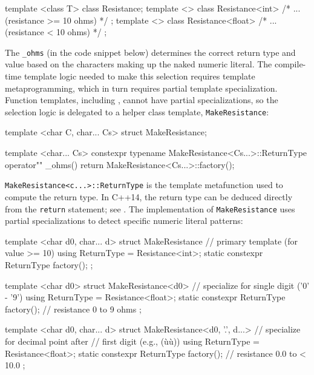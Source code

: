\begin{emcppslisting}[emcppsbatch=e12]
template <class T> class Resistance;
template <> class Resistance<int>   { /* ... (resistance >= 10 ohms) */ };
template <> class Resistance<float> { /* ... (resistance <  10 ohms) */ };
\end{emcppslisting}

\noindent The \lstinline!_ohms!  (in the code snippet below) determines the correct
return type and value based on the characters making up the naked
numeric literal. The compile-time template logic needed to make this
selection requires template metaprogramming, which in turn requires
partial template specialization. Function templates, including
, cannot have partial specializations,
so the selection logic is delegated to a helper class template,
\lstinline!MakeResistance!:

\begin{emcppslisting}[emcppsbatch=e12]
template <char C, char... Cs> struct MakeResistance;

template <char... Cs>
constexpr typename MakeResistance<Cs...>::ReturnType
operator"" _ohms() { return MakeResistance<Cs...>::factory(); }
\end{emcppslisting}

\noindent \lstinline!MakeResistance<c...>::ReturnType! is the template metafunction used to compute the return type. In C++14, the return type can
be deduced directly from the \lstinline!return! statement; see .
The implementation of \lstinline!MakeResistance! uses partial
specializations to detect specific numeric literal patterns:

\begin{emcppslisting}[emcppsbatch=e12]
template <char d0, char... d>
struct MakeResistance  // primary template (for value >= 10)
{
    using ReturnType = Resistance<int>;
    static constexpr ReturnType factory();
};

template <char d0>
struct MakeResistance<d0>  // specialize for single digit ('0' - '9')
{
    using ReturnType = Resistance<float>;
    static constexpr ReturnType factory(); // resistance 0 to 9 ohms
};

template <char d0, char... d>
struct MakeResistance<d0, '.', d...>  // specialize for decimal point after
                                      // first digit (e.g., (ù{}ù))
{
    using ReturnType = Resistance<float>;
    static constexpr ReturnType factory(); // resistance 0.0 to < 10.0
};
\end{emcppslisting}

